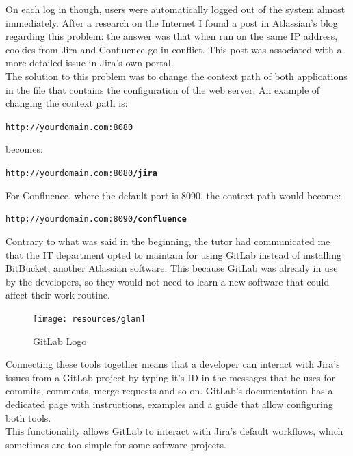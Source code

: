 	On each log in though, users were automatically logged out of the system almost immediately.
	After a research on the Internet I found a post\cite{user-is-constantly-logged-out-of-jira} in Atlassian's blog regarding this problem: the answer was that when run on the same IP address, cookies from Jira and Confluence go in conflict.
	This post was associated with a more detailed issue\cite{JRASERVER-36960} in Jira's own portal.\\
	The solution to this problem was to change the \gls{context path} of both applications\cite{how-to-change-the-jira-application-context-path} in the  file that contains the configuration of the web server.
	An example of changing the context path is:
	\begin{center}
		\texttt{http://yourdomain.com:8080}
	\end{center}
	\vspace{-10pt}
	becomes:
	\vspace{-10pt}
	\begin{center}
		\texttt{http://yourdomain.com:8080\textbf{/jira}}
	\end{center}
	For Confluence, where the default port is 8090, the context path would become:
	\begin{center}
		\texttt{http://yourdomain.com:8090\textbf{/confluence}}
	\end{center}
	Contrary to what was said in the beginning, the tutor had communicated me that the IT department opted to maintain for using GitLab\cite{gitlab} instead of installing BitBucket\cite{bitbucket}, another Atlassian software.	
	This because GitLab was already in use by the developers, so they would not need to learn a new software that could affect their work routine.
	\begin{figure}[H]
		\centering
		\texttt{[image: resources/glan]}\\
		\caption{GitLab Logo}
	\end{figure}
	Connecting these tools together means that a developer can interact with Jira's issues from a GitLab project by typing it's ID in the messages that he uses for commits, comments, merge requests and so on.
	GitLab's documentation has a dedicated page with instructions, examples and a guide that allow configuring both tools\cite{integrations}.\\
	This functionality allows GitLab to interact with Jira's default workflows, which sometimes are too simple for some software projects.\\
